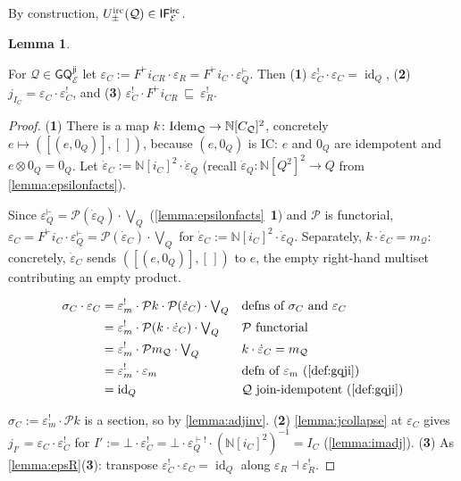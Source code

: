 \documentclass{article}
\makeatletter
\newcommand{\allproofs}{} %
\newif\ifproofsinappendix
\newcommand{\lemmawithproof}[3]{%
  \begin{lemma}\label{#1}
    #2  
    \ifproofsinappendix \hyperref[xxx#1]{(Proof)} \fi
  \end{lemma}
    \ifproofsinappendix
  \g@addto@macro\allproofs{%
    \par\medskip
    \noindent
    \subsection*{\cref{#1}}\par
    #2\par
    \begin{proof}\label{xxx#1}
      #3
    \end{proof}%
  }
      \else

    \begin{proof}
      #3
    \end{proof}
    \fi 
}
\theoremstyle{definition}
\newtheorem{lemma}{Lemma}[section]
\newcommand{\N}{\mathbb{N}}
\newcommand{\cE}{\mathcal{E}}
\newcommand{\cP}{\mathcal{P}}
\newcommand{\cQ}{\mathcal{Q}}
\newcommand{\cat}[1]{\mathsf{#1}}
\newcommand{\id}{\operatorname{id}}
\makeatother
\begin{document}
By construction, $U^{\rm irc}_\pm(\cQ)\in \cat{IF^{irc}_\cE}$.


 
\lemmawithproof{lemma:epsC}{
For $\cQ\in\cat{GQ^{ji}_\cE}$ let $\varepsilon_C:=F^\vdash i_{CR}\cdot\varepsilon_R
=F^\vdash i_C\cdot\varepsilon^\vdash_Q$. 
Then ({\bf 1}) $\varepsilon_C^!\cdot\varepsilon_C=\id_Q$, ({\bf 2}) $j_{I_C}=\varepsilon_C\cdot\varepsilon_C^!$, and ({\bf 3}) $\varepsilon_C^!\cdot F^\vdash i_{CR}\ \sqsubseteq\ \varepsilon_R^!$.
}{
({\bf 1}) There is a map $k\colon{\rm Idem}_\cQ\to\N[C_\cQ]^2$, concretely $e\mapsto([(e,0_Q)],[\,])$, because $(e,0_Q)$ is IC: $e$ and $0_Q$ are idempotent and $e\otimes 0_Q=0_Q$.
Let $\dot\varepsilon_C:=\N[i_C]^2\cdot\dot\varepsilon_Q$ (recall $\dot\varepsilon_Q\colon\N[Q^2]^2\to Q$ from \cref{lemma:epsilonfacts}).

Since $\varepsilon^\vdash_Q=\cP(\dot\varepsilon_Q)\cdot\bigvee_Q$ (\cref{lemma:epsilonfacts}~{\bf 1}) and $\cP$ is functorial, $\varepsilon_C=F^\vdash i_C\cdot\varepsilon^\vdash_Q =\cP(\dot\varepsilon_C)\cdot\bigvee_Q$ for $\dot\varepsilon_C:=\N[i_C]^2\cdot\dot\varepsilon_Q$. 
Separately, $k\cdot\dot\varepsilon_C=m_\cQ$: concretely, $\dot\varepsilon_C$ sends $([(e,0_Q)],[\,])$ to $e$, the empty right-hand multiset contributing an empty product.


\begin{align*}
\sigma_C\cdot\varepsilon_C
&= \varepsilon_m^!\cdot\cP k\cdot\cP(\dot\varepsilon_C)\cdot\textstyle\bigvee_Q
  && \text{defns of }\sigma_C\text{ and }\varepsilon_C\\
&= \varepsilon_m^!\cdot\cP(k\cdot\dot\varepsilon_C)\cdot\textstyle\bigvee_Q
  && \cP\text{ functorial}\\
&= \varepsilon_m^!\cdot\cP m_\cQ\cdot\textstyle\bigvee_Q
  && k\cdot\dot\varepsilon_C=m_\cQ\\
&= \varepsilon_m^!\cdot\varepsilon_m
  && \text{defn of }\varepsilon_m\ \text{(\cref{def:gqji})}\\
&= \id_Q
  && \cQ\text{ join-idempotent (\cref{def:gqji})}
\end{align*}

$\sigma_C:=\varepsilon_m^!\cdot\cP k$ is a section, so by \cref{lemma:adjinv}.
({\bf 2}) \cref{lemma:jcollapse} at $\varepsilon_C$ gives
$j_{I'}=\varepsilon_C\cdot\varepsilon_C^!$ for
$I':=\bot\cdot\varepsilon_C^!
=\bot\cdot\varepsilon^{\vdash!}_Q\cdot(\N[i_C]^2)^{-1}=I_C$
(\cref{lemma:imadj}).
({\bf 3}) As \cref{lemma:epsR}({\bf 3}): transpose
$\varepsilon_C^!\cdot\varepsilon_C=\id_Q$ along
$\varepsilon_R\dashv\varepsilon_R^!$.
}
 
\end{document}
